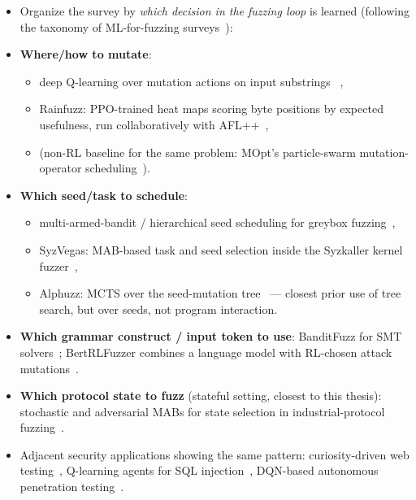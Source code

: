 \begin{itemize}
  \item Organize the survey by \emph{which decision in the fuzzing loop} is learned
    (following the taxonomy of ML-for-fuzzing surveys~\cite{wang_systematic_2020,qiu_survey_2025}):
  \item \textbf{Where/how to mutate}:
    \begin{itemize}
      \item deep Q-learning over mutation actions on input substrings
        ~\cite{bottinger_deep_2018},
      \item Rainfuzz: PPO-trained heat maps scoring byte positions by expected
        usefulness, run collaboratively with AFL++~\cite{binosi_rainfuzz_2023},
      \item (non-RL baseline for the same problem: MOpt's particle-swarm mutation-operator
        scheduling~\cite{lyu_mopt_nodate}).
    \end{itemize}
  \item \textbf{Which seed/task to schedule}:
    \begin{itemize}
      \item multi-armed-bandit / hierarchical seed scheduling for greybox
        fuzzing~\cite{wang_reinforcement_2021},
      \item SyzVegas: MAB-based task and seed selection inside the Syzkaller kernel
        fuzzer~\cite{wang_syzvegas_2021},
      \item Alphuzz: MCTS over the seed-mutation tree~\cite{zhao_alphuzz_2022} --- closest prior
        use of tree search, but over seeds, not program interaction.
    \end{itemize}
  \item \textbf{Which grammar construct / input token to use}:
    BanditFuzz for SMT solvers~\cite{christakis_banditfuzz_2020}; BertRLFuzzer combines a language
    model with RL-chosen attack mutations~\cite{jha_bertrlfuzzer_2024}.
  \item \textbf{Which protocol state to fuzz} (stateful setting, closest to this thesis):
    stochastic and adversarial MABs for state selection in industrial-protocol
    fuzzing~\cite{borcherding_bandits_2023}.
  \item Adjacent security applications showing the same pattern: curiosity-driven web
    testing~\cite{zheng_automatic_2021}, Q-learning agents for SQL
    injection~\cite{erdodi_simulating_2021}, DQN-based autonomous penetration
    testing~\cite{zhou_autonomous_2021}.
\end{itemize}

